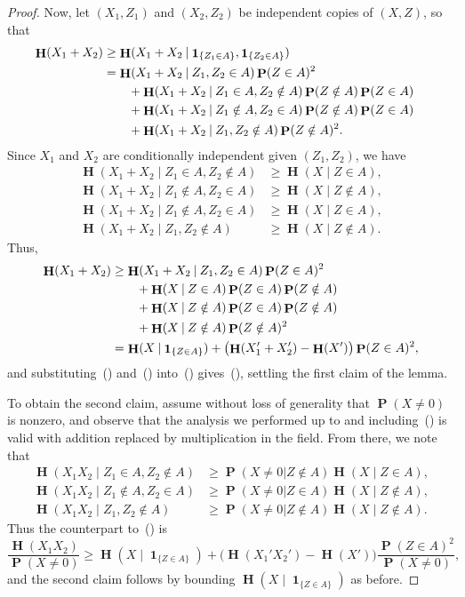 \documentclass[10pt,a4paper]{amsart}
\DeclareMathOperator{\Eta}{\mathbf{H}}
\renewcommand{\eqref}[1]{\textup{{\normalfont(\oldstylenums{\ref{#1}}}\normalfont)}}
\newcommand\given{\mathbin{|}}
\newcommand{\one}{\mathop{\mathbf{1}}\nolimits}
\DeclareMathOperator{\pr}{\mathbf{P}}
\begin{document}
\begin{proof}
Now, let $(X_1, Z_1)$ and $(X_2, Z_2)$ be independent copies of $(X,Z)$, so that
\begin{equation}\begin{aligned}\label{eqcheckpoint}
\Eta(X_1 + X_2) &\ge \Eta(X_1 + X_2\given \one_{\{Z_1\in A\}}, 
\one_{\{Z_2\in A\}}) \cr
&= \Eta(X_1 + X_2 \given Z_1, Z_2\in A) \pr(Z\in A)^2 \cr
&\qquad + \Eta(X_1 + X_2 \given Z_1\in A, Z_2\notin A) 
\pr(Z\notin A)\pr(Z\in A) \cr
&\qquad + \Eta(X_1 + X_2 \given Z_1\notin A, Z_2\in A)
\pr(Z\notin A)\pr(Z\in A) \cr
&\qquad + \Eta(X_1 + X_2 \given Z_1, Z_2\notin A) \pr(Z\notin A)^2.
\end{aligned}\end{equation}
Since $X_1$ and $X_2$ are conditionally independent 
given $(Z_1, Z_2)$, we have
\begin{align*}  
\Eta(X_1 + X_2 \given Z_1\in A, Z_2\notin A) &\ge \Eta(X\given Z\in A),\\
\Eta(X_1 + X_2 \given Z_1\notin A, Z_2\in A) &\ge \Eta(X\given Z\notin A),\\
\Eta(X_1 + X_2 \given Z_1\notin A, Z_2\in A) &\ge \Eta(X\given Z\in A),\\
\Eta(X_1 + X_2 \given Z_1, Z_2\notin A) &\ge \Eta(X\given Z\notin A).
\end{align*}
Thus,
\begin{equation}\begin{aligned}\label{eqadditioncounterpart}
\Eta(X_1 + X_2) &\ge \Eta(X_1 + X_2 \given Z_1, Z_2\in A) \pr(Z\in A)^2 \cr
&\qquad+\Eta(X\given Z\in A)   \pr(Z\in A)\pr(Z\notin A)  \\
&\qquad+\Eta(X\given Z\notin A)\pr(Z\in A)\pr(Z\notin A) \cr 
&\qquad+\Eta(X\given Z\notin A)\pr(Z\notin A)^2\cr
&= \Eta(X\given \one_{\{Z\in A\}}) + \bigl(\Eta(X_1'+X_2') 
- \Eta(X')\bigr)\pr(Z\in A)^2, 
\end{aligned}\end{equation}
and substituting~\eqref{eqCoverlog} and~\eqref{eqloglogoverlog} 
into~\eqref{eqadditioncounterpart} gives~\eqref{eq:firstclaim},
settling the first claim of the lemma.

To obtain the second claim, 
assume without loss of generality that 
$\pr(X\neq 0)$ is nonzero, and
observe that the analysis we performed up to and including~\eqref{eqcheckpoint} is valid with addition replaced by multiplication in the field. 
From there, we note that
\begin{align*}
\Eta(X_1 X_2 \given Z_1\in A, Z_2\notin A) 
&\ge \pr(X\ne 0|Z\notin A)
\Eta(X\given Z\in A),\\
\Eta(X_1 X_2 \given Z_1\notin A, Z_2\in A) 
&\ge \pr(X\ne 0|Z\in A)
\Eta(X\given Z\notin A),\\
\Eta(X_1 X_2 \given Z_1, Z_2\notin A) 
&\ge \pr(X\ne 0|Z\notin A)
\Eta(X\given Z\notin A).
\end{align*}
Thus the counterpart to~\eqref{eqadditioncounterpart} is
$$\frac{\Eta(X_1X_2)}{\pr(X\ne 0)}\ge 
\Eta(X\given \one_{\{Z\in A\}}) + 
\bigl(\Eta(X_1'X_2') - \Eta(X')\bigr)\frac{\pr(Z\in A)^2}{\pr(X\ne 0)},$$
and the second claim follows by 
bounding $\Eta(X\given \one_{\{Z\in A\}})$ as before. 
\end{proof}
\end{document}
